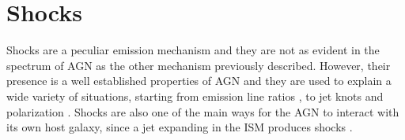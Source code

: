 \documentclass[../thesis.tex]{subfiles}
\begin{document}
\section{Shocks}
\label{sec:shocks}

Shocks are a peculiar emission mechanism and they are not as evident in the spectrum of AGN as the other mechanism previously described.
However, their presence is a well established properties of AGN \citep[e.g.][]{Dopita95}
and they are used to explain a wide variety of situations, starting from emission line ratios \citep[e.g.][]{Dopita95b,Dopita00,Contini02,Congiu17}, to jet knots and polarization \citep[e.g.][]{Lister05, Beckmann12}.
Shocks are also one of the main ways for the AGN to interact with its own host galaxy, since a jet expanding in the ISM produces shocks \citep{Dopita00,Fragile17}.
\end{document}
